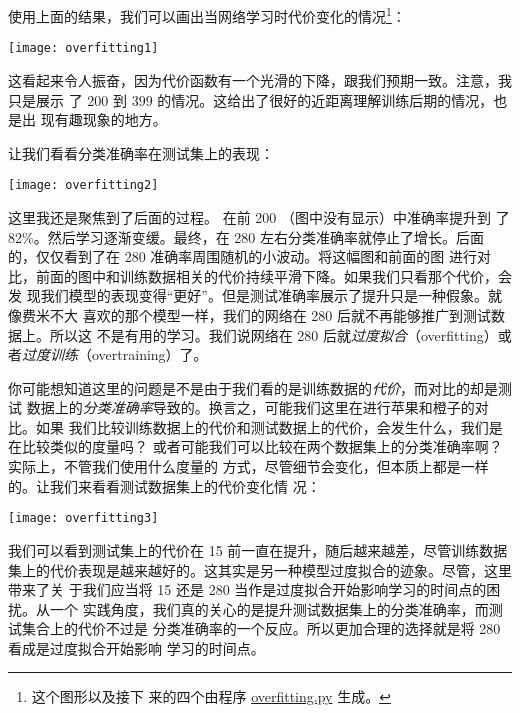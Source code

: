 使用上面的结果，我们可以画出当网络学习时代价变化的情况\footnote{这个图形以及接下
  来的四个由程序
  \href{https://github.com/mnielsen/neural-networks-and-deep-learning/blob/master/fig/overfitting.py}{overfitting.py}
  生成。}：
\begin{center}
  \texttt{[image: overfitting1]}
\end{center}
  
这看起来令人振奋，因为代价函数有一个光滑的下降，跟我们预期一致。注意，我只是展示
了 $200$ 到 $399$ \epoch{}的情况。这给出了很好的近距离理解训练后期的情况，也是出
现有趣现象的地方。

让我们看看分类准确率在测试集上的表现：
\begin{center}
  \texttt{[image: overfitting2]}
\end{center}

这里我还是聚焦到了后面的过程。 在前 200 \epochs{}（图中没有显示）中准确率提升到
了 82\%。然后学习逐渐变缓。最终，在 280 \epoch{}左右分类准确率就停止了增长。后面
的\epochs{}，仅仅看到了在 280 \epoch{}准确率周围随机的小波动。将这幅图和前面的图
进行对比，前面的图中和训练数据相关的代价持续平滑下降。如果我们只看那个代价，会发
现我们模型的表现变得“更好”。但是测试准确率展示了提升只是一种假象。就像费米不大
喜欢的那个模型一样，我们的网络在 280 \epoch{}后就不再能够推广到测试数据上。所以这
不是有用的学习。我们说网络在 280 \epoch{}后就\emph{过度拟合}（overfitting）或者\emph{过度训练}（overtraining）了。

你可能想知道这里的问题是不是由于我们看的是训练数据的\emph{代价}，而对比的却是测试
数据上的\emph{分类准确率}导致的。换言之，可能我们这里在进行苹果和橙子的对比。如果
我们比较训练数据上的代价和测试数据上的代价，会发生什么，我们是在比较类似的度量吗？
或者可能我们可以比较在两个数据集上的分类准确率啊？实际上，不管我们使用什么度量的
方式，尽管细节会变化，但本质上都是一样的。让我们来看看测试数据集上的代价变化情
况：
\begin{center}
  \texttt{[image: overfitting3]}
\end{center}

我们可以看到测试集上的代价在 15 \epoch{}前一直在提升，随后越来越差，尽管训练数据
集上的代价表现是越来越好的。这其实是另一种模型过度拟合的迹象。尽管，这里带来了关
于我们应当将 15 还是 280 \epoch{}当作是过度拟合开始影响学习的时间点的困扰。从一个
实践角度，我们真的关心的是提升测试数据集上的分类准确率，而测试集合上的代价不过是
分类准确率的一个反应。所以更加合理的选择就是将 280 \epoch{}看成是过度拟合开始影响
学习的时间点。

